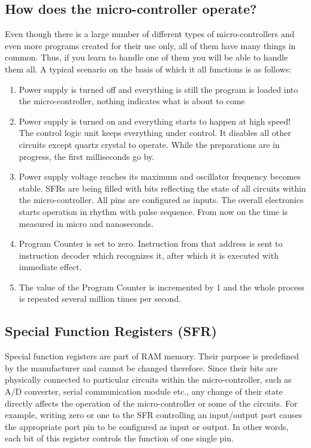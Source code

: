 \subsection{How does the micro-controller operate?}
Even though there is a large number of different types of micro-controllers and even more programs created for their use only, all of them have many things in common. Thus, if you learn to handle one of them you will be able to handle them all. A typical scenario on the basis of which it all functions is as follows:
\begin{enumerate}
\item Power supply is turned off and everything is still the program is loaded into the micro-controller, nothing indicates what is about to come
\item Power supply is turned on and everything starts to happen at high speed! The control logic unit keeps everything under control. It disables all other circuits except quartz crystal to operate. While the preparations are in progress, the first milliseconds go by.
\item Power supply voltage reaches its maximum and oscillator frequency becomes stable. SFRs are being filled with bits reflecting the state of all circuits within the micro-controller. All pins are configured as inputs. The overall electronics starts operation in rhythm with pulse sequence. From now on the time is measured in micro and nanoseconds.
\item Program Counter is set to zero. Instruction from that address is sent to instruction decoder which recognizes it, after which it is executed with immediate effect.
\item The value of the Program Counter is incremented by 1 and the whole process is repeated several million times per second.
\end{enumerate}


\subsection{Special Function Registers (SFR)}
Special function registers are part of RAM memory. Their purpose is predefined by the manufacturer and cannot be changed therefore. Since their bits are physically connected to particular circuits within the micro-controller, such as A/D converter, serial communication module etc., any change of their state directly affects the operation of the micro-controller or some of the circuits. For example, writing zero or one to the SFR controlling an input/output port causes the appropriate port pin to be configured as input or output. In other words, each bit of this register controls the function of one single pin.

